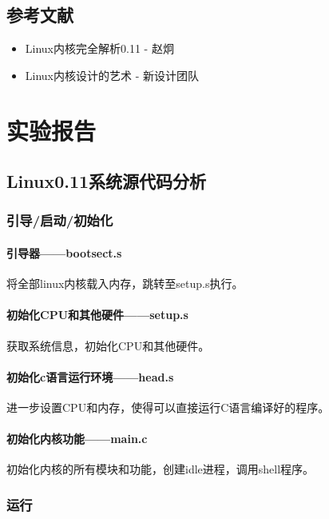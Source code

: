 \documentclass[]{report}
\begin{document}
\chapter{参考文献}
\begin{itemize}
    \item Linux内核完全解析0.11
    \subitem - 赵炯
    \item Linux内核设计的艺术
    \subitem - 新设计团队
\end{itemize}

\part{实验报告}

\chapter{Linux0.11系统源代码分析}

\section{引导/启动/初始化}

\subsection{引导器——bootsect.s}

将全部linux内核载入内存，跳转至setup.s执行。

\subsection{初始化CPU和其他硬件——setup.s}

获取系统信息，初始化CPU和其他硬件。

\subsection{初始化c语言运行环境——head.s}

进一步设置CPU和内存，使得可以直接运行C语言编译好的程序。

\subsection{初始化内核功能——main.c}

初始化内核的所有模块和功能，创建idle进程，调用shell程序。

\section{运行}
\end{document}
